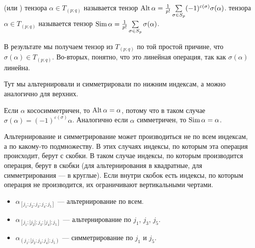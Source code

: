 \documentclass{article}
\begin{document}
    \begin{itemize}
        \dfn {} (или ) тензора $\alpha\in T_{(p;q)}$ называется тензор $\operatorname{Alt}\alpha=\frac1{p!}\sum\limits_{\sigma\in S_p}(-1)^{\varepsilon(\sigma)}\sigma(\alpha)$.
        \dfn {} тензора $\alpha\in T_{(p;q)}$ называется тензор $\operatorname{Sim}\alpha=\frac1{p!}\sum\limits_{\sigma\in S_p}\sigma(\alpha)$.
        \begin{Comment}
            В результате мы получаем тензор из $T_{(p;q)}$ по той простой причине, что $\sigma(\alpha)\in T_{(p;q)}$. Во-вторых, понятно, что это линейная операция, так как $\sigma(\alpha)$ линейна. 
        \end{Comment}
        \begin{Comment}
            Тут мы альтернировали и симметрировали по нижним индексам, а можно аналогично для верхних.
        \end{Comment}
        \begin{Comment}
            Если $\alpha$ кососимметричен, то $\operatorname{Alt}\alpha=\alpha$, потому что в таком случае $\sigma(\alpha)=(-1)^{\varepsilon(\sigma)}\alpha$. Аналогично если $\alpha$ симметричен, то $\operatorname{Sim}\alpha=\alpha$.
        \end{Comment}
        \begin{Comment}
            Альтернирование и симметрирование может производиться не по всем индексам, а по какому-то подмножеству. В этих случаях индексы, по которым эта операция происходит, берут с скобки. В таком случае индексы, по которым производится операция, берут в скобки (для альтернирования в квадратные, для симметрирования --- в круглые). Если внутри скобок есть индексы, по которым операция не производится, их ограничивают вертикальными чертами.
        \end{Comment}
        \begin{Example}
            \begin{itemize}
                \item $\alpha_{[j_1;j_2;j_3;j_4;j_5]}$ --- альтернирование по всем.
                \item $\alpha_{[j_1;|j_2|;j_3;|j_4|;j_5]}$ --- альтернирование по $j_1$, $j_3$, $j_5$.
                \item $\alpha_{(j_1;|j_2;j_3;j_4|;j_5)}$ --- симметрирование по $j_1$ и $j_5$.
            \end{itemize}
        \end{Example}
        \begin{Example}

\end{Example}
\end{itemize}
\end{document}

